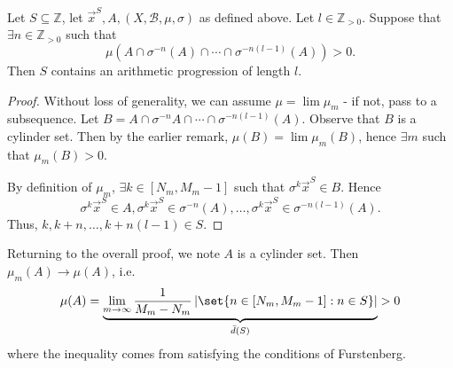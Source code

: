 \documentclass{article}
\begin{document}
\begin{prop}
  Let $S \subseteq \mathbb{Z}$, let $\vec{x}^S, A, (X, \mathcal{B}, \mu, \sigma)$ as defined above.
  Let $l \in \mathbb{Z}_{> 0}$.
  Suppose that $\exists n \in \mathbb{Z}_{>0}$ such that
  \begin{equation*}
    \mu\left(A \cap \sigma^{-n}(A) \cap \dotsb \cap \sigma^{-n(l-1)}(A)\right) > 0.
  \end{equation*}
  Then $S$ contains an arithmetic progression of length $l$.
\end{prop}
\begin{proof}
  Without loss of generality, we can assume $\mu = \lim \mu_m$ - if not, pass to a subsequence.
  Let $B = A \cap \sigma^{-n} A \cap \dotsb \cap \sigma^{-n (l-1)} (A).$
  Observe that $B$ is a cylinder set.
  Then by the earlier remark, $\mu(B) = \lim \mu_m(B)$, hence $\exists m$ such that $\mu_m(B) > 0$.

  By definition of $\mu_m$, $\exists k \in [N_m, M_m - 1]$ such that $\sigma^k \vec{x}^S \in B$.
  Hence
  \begin{equation*}\sigma^k \vec{x}^S \in A, \sigma^k \vec{x}^S \in \sigma^{-n}(A), \dotsc, \sigma^k \vec{x}^S \in \sigma^{-n(l-1)}(A).\end{equation*}
  Thus, $k, k+n, \dotsc, k + n(l-1) \in S$.
\end{proof}
Returning to the overall proof, we note $ A $ is a cylinder set.
Then $ \mu_m(A)\to\mu(A) $, i.e.\
\begin{equation*} \mu(A) = \underbrace{\lim_{m\to\infty}\frac{1}{M_m-N_m}\left|\set{n\in[N_m,M_m-1]: n\in S}\right|}_{\bar{d}(S)} > 0 \end{equation*}
where the inequality comes from satisfying the conditions of Furstenberg.
\end{document}
